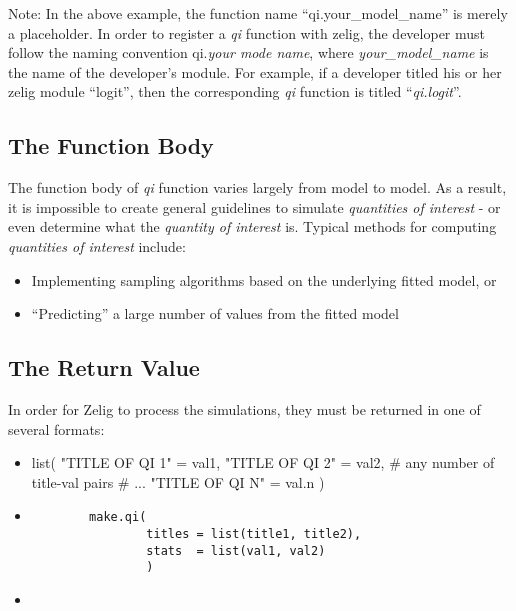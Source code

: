 \noindent Note: In the above example, the function name ``qi.your\_model\_name'' is
merely a placeholder.  In order to register a \emph{qi} function with zelig, the
developer must follow the naming convention qi.\emph{your mode name}, where
\emph{your\_model\_name} is the name of the developer's module.  For example, if a
developer titled his or her zelig module ``logit'', then the corresponding \emph{qi}
function is titled ``\emph{qi.logit}''.

%
\subsection{The Function Body}
The function body of \emph{qi} function varies largely from model to model.  As a
result, it is impossible to create general guidelines to simulate \emph{quantities of
interest} - or even determine what the \emph{quantity of interest} is.  Typical methods
for computing \emph{quantities of interest} include:

\begin{itemize}

	\item Implementing sampling algorithms based on the underlying fitted model, or

	\item ``Predicting'' a large number of values from the fitted model

\end{itemize}


\subsection{The Return Value}
In order for Zelig to process the simulations, they must be returned in one of several formats:

\begin{itemize}
	\item \begin{Code}
		list(
		     "TITLE OF QI 1" = val1,
		     "TITLE OF QI 2" = val2,
		     # any number of title-val pairs
		     # ...
		     "TITLE OF QI N" = val.n
		     )
	\end{Code}

	\item \begin{verbatim}
		make.qi(
		        titles = list(title1, title2),
		        stats  = list(val1, val2)
		        )
	\end{verbatim}
  \item
\end{itemize}


